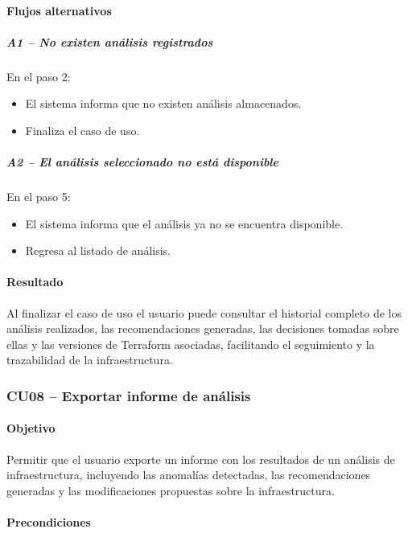 \paragraph*{Flujos alternativos}

\subparagraph{A1 -- No existen análisis registrados}

En el paso 2:

\begin{itemize}
\item El sistema informa que no existen análisis almacenados.
\item Finaliza el caso de uso.
\end{itemize}

\subparagraph{A2 -- El análisis seleccionado no está disponible}

En el paso 5:

\begin{itemize}
\item El sistema informa que el análisis ya no se encuentra disponible.
\item Regresa al listado de análisis.
\end{itemize}

\paragraph*{Resultado}

Al finalizar el caso de uso el usuario puede consultar el historial completo de los análisis realizados, las recomendaciones generadas, las decisiones tomadas sobre ellas y las versiones de Terraform asociadas, facilitando el seguimiento y la trazabilidad de la infraestructura.

\subsubsection{CU08 -- Exportar informe de análisis}

\paragraph*{Objetivo}

Permitir que el usuario exporte un informe con los resultados de un análisis de infraestructura, incluyendo las anomalías detectadas, las recomendaciones generadas y las modificaciones propuestas sobre la infraestructura.

\paragraph*{Precondiciones}

